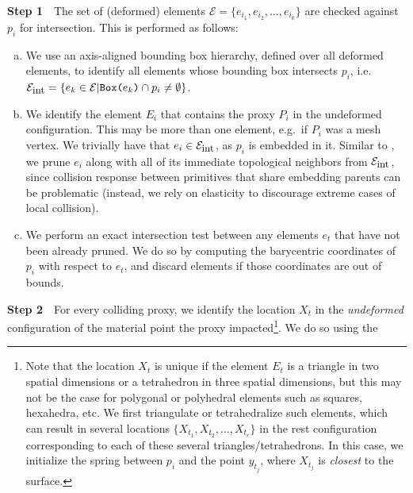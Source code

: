 \textbf{Step 1}\ \ The set of (deformed) elements $\mathcal
  E=\{e_{i_1},e_{i_2},\ldots,e_{i_k}\}$ are checked against $p_i$ for intersection. This is performed as follows:

  \begin{enumerate}[(a)]
    \vspace*{-.07in}\item We use an axis-aligned bounding box
    hierarchy, defined over all deformed elements, to identify all
    elements whose bounding box intersects $p_i$, i.e.\
    $\mathcal{E}_{\mbox{\small
        int}}=\{e_k\in\mathcal{E}|\texttt{Box(}e_k\texttt{)}\cap
    p_i\neq\emptyset\}$.

    \vspace*{-.07in}\item We identify the element $E_i$ that contains the proxy
    $P_i$ in the undeformed configuration. This may be more than one element,
    e.g.\ if $P_i$ was a mesh vertex. We trivially have that
    $e_i\in\mathcal{E}_{\mbox{\small int}}$, as $p_i$ is embedded in it.
    Similar to \citet{McAdaZSETTS:2011}, we prune $e_i$ along with all of its immediate topological neighbors from
    $\mathcal{E}_{\mbox{\small int}}$, since collision response between
    primitives that share embedding parents can be problematic
    (instead, we rely on
    elasticity to discourage extreme cases of local collision).


    \vspace*{-.07in}\item We perform an exact intersection test
    between any elements $e_t$ that have not been already pruned. We
    do so by computing the barycentric coordinates of $p_i$ with
    respect to $e_t$, and discard elements if those coordinates are
    out of bounds.

  \end{enumerate}
  \vspace*{-.07in} \textbf{Step 2}\ \ For every colliding proxy, we
  identify the location $X_t$ in the \emph{undeformed} configuration
  of the material point the proxy impacted\footnote{Note that the location $X_t$ is unique if the element
$E_t$ is a triangle in two spatial dimensions or a tetrahedron in
three spatial dimensions, but this may not be the case for polygonal
or polyhedral elements such as squares, hexahedra, etc. We first
triangulate or tetrahedralize such elements, which can result in
several locations $\{X_{t_1},X_{t_2},\ldots,X_{t_r}\}$ in the rest
configuration corresponding to each of these several
triangles/tetrahedrons. In this case, we initialize the spring between
$p_i$ and the point $y_{t_j}$, where $X_{t_j}$ is \emph{closest} to
the surface.}. We do so using the
